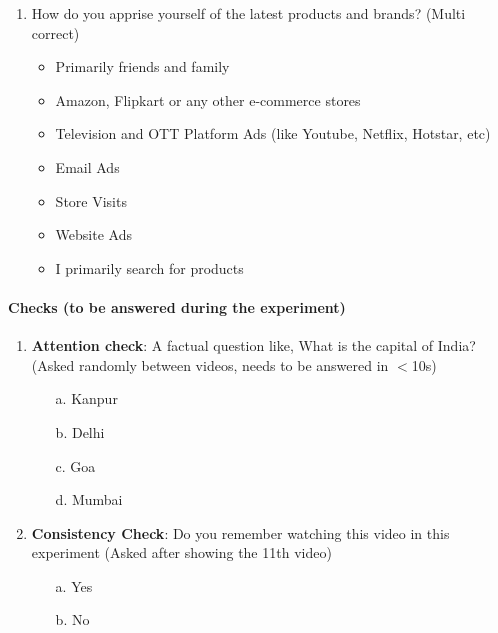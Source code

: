 \begin{enumerate}
    \item How do you apprise yourself of the latest products and brands? (Multi correct)
    \begin{itemize}
        \item Primarily friends and family
        \item Amazon, Flipkart or any other e-commerce stores
        \item Television and OTT Platform Ads (like Youtube, Netflix, Hotstar, etc)
        \item Email Ads
        \item Store Visits
        \item Website Ads
        \item I primarily search for products
    \end{itemize}
    \end{enumerate}
    
    
\paragraph{Checks (to be answered during the experiment)}
    \begin{enumerate}
        \item \textbf{Attention check}: A factual question like, What is the capital of India? (Asked randomly between videos, needs to be answered in $<$10s)
        \begin{itemize}
            \item[a.] Kanpur
            \item[b.] Delhi
            \item[c.] Goa
            \item[d.] Mumbai
        \end{itemize}
        \item \textbf{Consistency Check}:  Do you remember watching this video in this experiment (Asked after showing the 11th video)
    \begin{itemize}
        \item[a.] Yes
        \item[b.] No
    \end{itemize}
    \end{enumerate}

